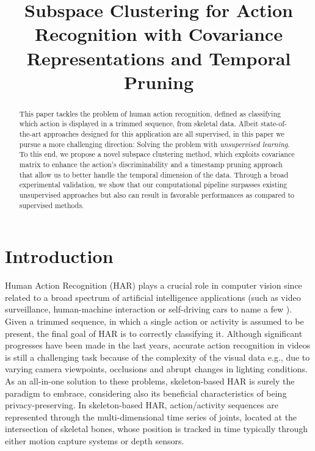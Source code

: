 \documentclass[10pt,a4paper,conference]{IEEEtran}
\begin{document}
\title{Subspace Clustering for Action Recognition with Covariance Representations and Temporal Pruning}

\author{
}





\maketitle

\begin{abstract}
This paper tackles the problem of human action recognition, defined as classifying which action is displayed in a trimmed sequence, from skeletal data.
Albeit state-of-the-art approaches designed for this application are all supervised, in this paper we pursue a more challenging direction: Solving the problem with \emph{unsupervised learning}. To this end, we propose a novel subspace clustering method, which exploits covariance matrix to enhance the action's discriminability and a timestamp pruning approach that allow us to better handle the temporal dimension of the data.
Through a broad experimental validation, we show that our computational pipeline surpasses existing unsupervised approaches but also can result in favorable performances as compared to supervised methods. \end{abstract}

\IEEEpeerreviewmaketitle

\section{Introduction}\label{sec:intro}


Human Action Recognition (HAR) plays a crucial role in 
computer vision since related to a broad spectrum of artificial intelligence applications (such as video surveillance, human-machine interaction or self-driving cars to name a few \cite{survey_Poppe}). Given a trimmed sequence, in which a single action or activity is assumed to be present, the final goal of HAR is to correctly classifying it. Although significant progresses have been made in the last years, accurate action recognition in videos is still a challenging task because of the complexity of the visual data e.g., due to varying camera viewpoints, occlusions and abrupt changes in lighting conditions.     As an all-in-one solution to these problems, skeleton-based HAR is surely the paradigm to embrace, considering also its beneficial characteristics of being privacy-preserving. In skeleton-based HAR, action/activity sequences are represented through the multi-dimensional time series of joints, located at the intersection of skeletal bones, whose position is tracked in time typically through either motion capture systems or depth sensors. 
\end{document}

